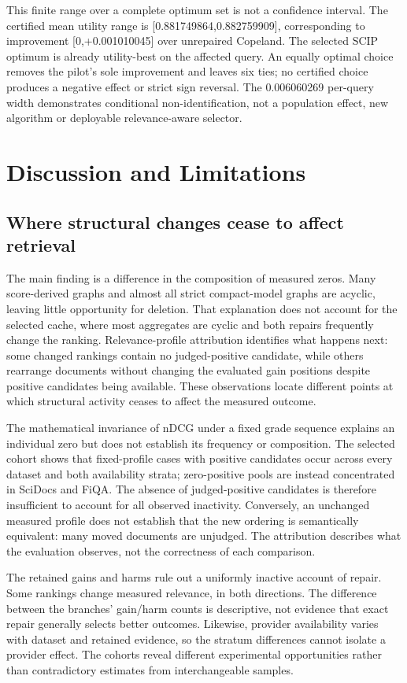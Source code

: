 \documentclass[pdflatex,iicol,sn-basic,Numbered]{sn-jnl}
\begin{document}
This finite range over a complete optimum set is not a confidence interval. The certified mean utility range is [0.881749864,0.882759909], corresponding to improvement [0,+0.001010045] over unrepaired Copeland. The selected SCIP optimum is already utility-best on the affected query. An equally optimal choice removes the pilot's sole improvement and leaves six ties; no certified choice produces a negative effect or strict sign reversal. The 0.006060269 per-query width demonstrates conditional non-identification, not a population effect, new algorithm or deployable relevance-aware selector.

\section{Discussion and Limitations}\label{sec:discussion}
\subsection{Where structural changes cease to affect retrieval}
The main finding is a difference in the composition of measured zeros. Many score-derived graphs and almost all strict compact-model graphs are acyclic, leaving little opportunity for deletion. That explanation does not account for the selected cache, where most aggregates are cyclic and both repairs frequently change the ranking. Relevance-profile attribution identifies what happens next: some changed rankings contain no judged-positive candidate, while others rearrange documents without changing the evaluated gain positions despite positive candidates being available. These observations locate different points at which structural activity ceases to affect the measured outcome.

The mathematical invariance of nDCG under a fixed grade sequence explains an individual zero but does not establish its frequency or composition. The selected cohort shows that fixed-profile cases with positive candidates occur across every dataset and both availability strata; zero-positive pools are instead concentrated in SciDocs and FiQA. The absence of judged-positive candidates is therefore insufficient to account for all observed inactivity. Conversely, an unchanged measured profile does not establish that the new ordering is semantically equivalent: many moved documents are unjudged. The attribution describes what the evaluation observes, not the correctness of each comparison.

The retained gains and harms rule out a uniformly inactive account of repair. Some rankings change measured relevance, in both directions. The difference between the branches' gain/harm counts is descriptive, not evidence that exact repair generally selects better outcomes. Likewise, provider availability varies with dataset and retained evidence, so the stratum differences cannot isolate a provider effect. The cohorts reveal different experimental opportunities rather than contradictory estimates from interchangeable samples.
\end{document}
